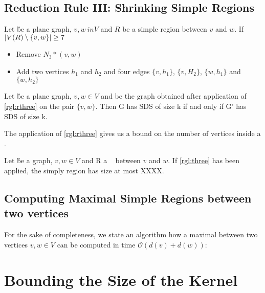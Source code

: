 \subsection{Reduction Rule III: Shrinking Simple Regions}
\begin{rgl}\label{rgl:rthree}
    Let \G be a plane graph, $v, w \ in V$ and $R$ be a simple region between $v$ and $w$. If $\abs{V(R) \setminus \{v, w\}} \geq 7$

    \begin{itemize}
        \item Remove $N_3*(v,w)$
        \item Add two vertices $h_1$ and $h_2$ and four edges $\{v, h_1\}$, $\{v, H_2\}$, $\{w, h_1\}$ and $\{w, h_2\}$
    \end{itemize}
\end{rgl}
\begin{lemma}

    Let \G be a plane graph, $v, w \in V$ and \GB be the graph obtained after application of \cref{rgl:rthree} on the pair $\{v, w\}$. Then G has SDS of size k if and only if G' has SDS of size k.
\end{lemma}

The application of \cref{rgl:rthree} gives us a bound on the number of vertices inside a \sr. 
\begin{corollary}
    Let \G be a graph, $v, w\in V$ and R a \sr~ between $v$ and $w$. If \cref{rgl:three} has been applied, the simply region has size at most XXXX.
\end{corollary}

\subsection{Computing Maximal Simple Regions between two vertices}

For the sake of completeness, we state an algorithm how a maximal \sr between two vertices $v,w \in V$ can be computed in time $\mathcal{O}(d(v) + d(w))$:

%    


%    

\section{Bounding the Size of the Kernel}


